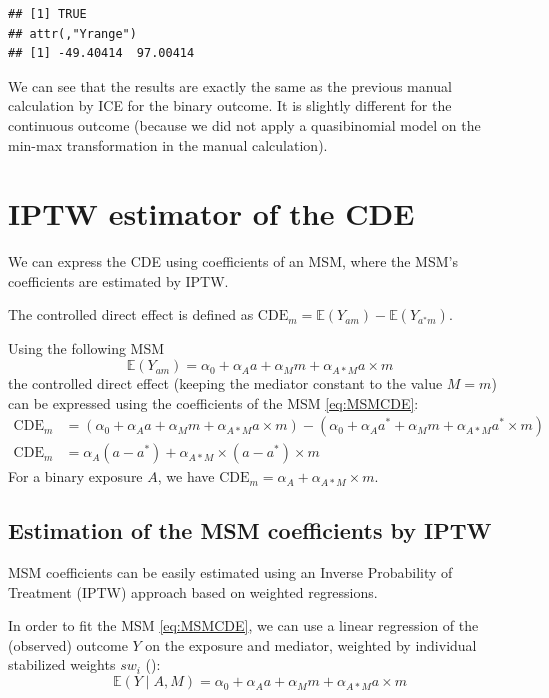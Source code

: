\documentclass[
]{book}
\begin{document}
\begin{verbatim}
## [1] TRUE
## attr(,"Yrange")
## [1] -49.40414  97.00414
\end{verbatim}

We can see that the results are exactly the same as the previous manual calculation by ICE for the binary outcome. It is slightly different for the continuous outcome (because we did not apply a quasibinomial model on the min-max transformation in the manual calculation).

\section{IPTW estimator of the CDE}\label{iptw-estimator-of-the-cde}

We can express the CDE using coefficients of an MSM, where the MSM's coefficients are estimated by IPTW.

The controlled direct effect is defined as \(\text{CDE}_m= \mathbb{E}(Y_{am}) - \mathbb{E}(Y_{a^*m})\).

Using the following MSM
\begin{equation} 
  \mathbb{E}(Y_{am}) = \alpha_0 + \alpha_A a + \alpha_M m + \alpha_{A \ast M} a \times m
  \label{eq:MSMCDE}
\end{equation}
the controlled direct effect (keeping the mediator constant to the value \(M=m\)) can be expressed using the coefficients of the MSM \eqref{eq:MSMCDE}:
\begin{align*} 
  \text{CDE}_m &= (\alpha_0 + \alpha_A a + \alpha_M m + \alpha_{A \ast M} a \times m) - (\alpha_0 + \alpha_A a^* + \alpha_M m + \alpha_{A \ast M} a^* \times m) \\
  \text{CDE}_m &= \alpha_A(a - a^* ) + \alpha_{A \ast M} \times (a - a^*) \times m
\end{align*}
For a binary exposure \(A\), we have \(\text{CDE}_m=\alpha_A + \alpha_{A \ast M} \times m\).

\subsection{Estimation of the MSM coefficients by IPTW}\label{estimation-of-the-msm-coefficients-by-iptw}

MSM coefficients can be easily estimated using an Inverse Probability of Treatment (IPTW) approach based on weighted regressions.

In order to fit the MSM \eqref{eq:MSMCDE}, we can use a linear regression of the (observed) outcome \(Y\) on the exposure and mediator, weighted by individual stabilized weights \(sw_i\) ():
\begin{equation} 
  \mathbb{E}\left(Y \mid A,M\right) = \alpha_0 + \alpha_A a + \alpha_M m + \alpha_{A \ast M} a \times m
\end{equation}
\end{document}
